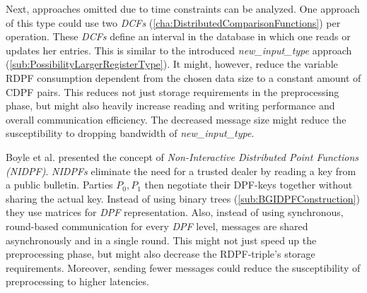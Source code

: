 Next, approaches omitted due to time constraints can be analyzed.
One approach of this type could use two \textit{DCFs} (\ref{cha:DistributedComparisonFunctions}) per operation.
These \textit{DCFs} define an interval in the database in which one reads or updates her entries.
This is similar to the introduced \textit{new\_input\_type} approach (\ref{sub:PossibilityLargerRegisterType}).
It might, however, reduce the variable RDPF consumption dependent from the chosen data size to a constant amount of CDPF pairs.
This reduces not just storage requirements in the preprocessing phase, but might also heavily increase reading and writing performance and overall communication efficiency.
The decreased message size might reduce the susceptibility to dropping bandwidth of \textit{new\_input\_type}.

Boyle et al. \cite{boyle2025non} presented the concept of \textit{Non-Interactive Distributed Point Functions (NIDPF)}.
\textit{NIDPFs} eliminate the need for a trusted dealer by reading a key from a public bulletin.
Parties $P_0,P_1$ then negotiate their DPF-keys together without sharing the actual key.
Instead of using binary trees (\ref{sub:BGIDPFConstruction}) they use matrices for \textit{DPF} representation.
Also, instead of using synchronous, round-based communication for every \textit{DPF} level, messages are shared asynchronously and in a single round.
This might not just speed up the preprocessing phase, but might also decrease the RDPF-triple's storage requirements.
Moreover, sending fewer messages could reduce the susceptibility of preprocessing to higher latencies.